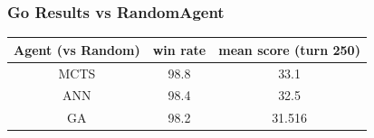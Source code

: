 \documentclass{beamer}
\begin{document}
\begin{frame}
\frametitle{Go Results vs RandomAgent}
\begin{center}
\begin{tabular}{|c|c|c|}
\hline
Agent (vs Random) & win rate & mean score (turn 250) \\ \hline \hline
MCTS & 98.8 & 33.1 \\ \hline
ANN & 98.4 & 32.5 \\ \hline
GA & 98.2 & 31.516 \\ \hline
\end{tabular}
\end{center}
\end{frame}

\end{document}

